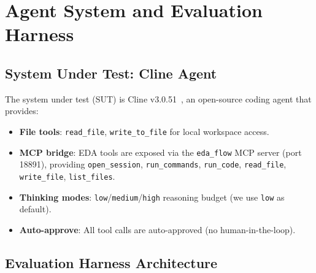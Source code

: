 \section{Agent System and Evaluation Harness}
\label{sec:method}

\subsection{System Under Test: Cline Agent}
\label{sec:cline-agent}

The system under test (SUT) is Cline v3.0.51~\cite{cline2026}, an open-source coding agent that provides:
\begin{itemize}
    \item \textbf{File tools}: \texttt{read\_file}, \texttt{write\_to\_file} for local workspace access.
    \item \textbf{MCP bridge}: EDA tools are exposed via the \texttt{eda\_flow} MCP server (port 18891), providing \texttt{open\_session}, \texttt{run\_commands}, \texttt{run\_code}, \texttt{read\_file}, \texttt{write\_file}, \texttt{list\_files}.
    \item \textbf{Thinking modes}: \texttt{low}/\texttt{medium}/\texttt{high} reasoning budget (we use \texttt{low} as default).
    \item \textbf{Auto-approve}: All tool calls are auto-approved (no human-in-the-loop).
\end{itemize}

\subsection{Evaluation Harness Architecture}
\label{sec:harness}

